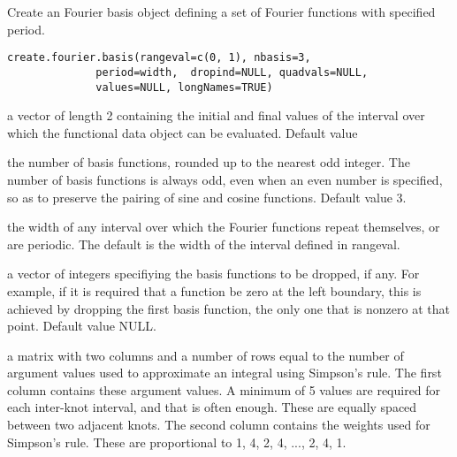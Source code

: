 \begin{Description}\relax
Create an Fourier basis object defining a set of Fourier
functions with specified period.
\end{Description}
\begin{Usage}
\begin{verbatim}
create.fourier.basis(rangeval=c(0, 1), nbasis=3,
              period=width,  dropind=NULL, quadvals=NULL,
              values=NULL, longNames=TRUE)
\end{verbatim}
\end{Usage}
\begin{Arguments}
\begin{ldescription}
\item[\code{rangeval}] a vector of length 2 containing the initial and final
values of the interval over which the functional
data object can be evaluated.  Default value 

\item[\code{nbasis}] the number of basis functions, rounded up to the nearest odd
integer.  The number of basis functions is always odd, even when an
even number is specified, so as to preserve the pairing of sine and
cosine functions.  Default value 3. 

\item[\code{period}] the width of any interval over which the Fourier functions repeat
themselves, or are periodic.  The default is the width of the
interval defined in rangeval.

\item[\code{dropind}] a vector of integers specifiying the basis functions to
be dropped, if any.  For example, if it is required that
a function be zero at the left boundary, this is achieved
by dropping the first basis function, the only one that
is nonzero at that point. Default value NULL.

\item[\code{quadvals}] a matrix with two columns and a number of rows equal to the number
of argument values used to approximate an integral using Simpson's
rule.  The first column contains these argument values.  A minimum
of 5 values are required for each inter-knot interval, and that is
often enough. These are equally spaced between two adjacent knots.
The second column contains the weights used for Simpson's rule.
These are proportional to 1, 4, 2, 4, ..., 2, 4, 1.  


\end{ldescription}
\end{Arguments}
